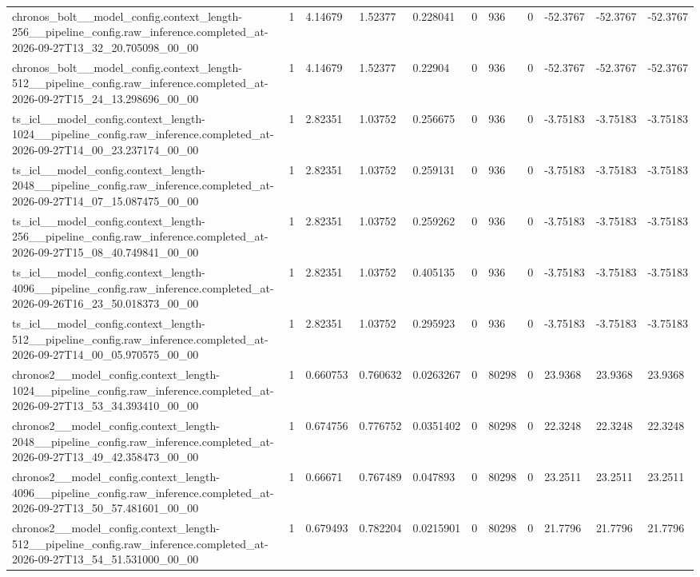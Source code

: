 \begin{tabular}{lllllllllll}
chronos\_bolt\_\_model\_config.context\_length-256\_\_pipeline\_config.raw\_inference.completed\_at-2026-09-27T13\_32\_20.705098\_00\_00 & 1 & 4.14679 & 1.52377 & 0.228041 & 0 & 936 & 0 & -52.3767 & -52.3767 & -52.3767 \\
chronos\_bolt\_\_model\_config.context\_length-512\_\_pipeline\_config.raw\_inference.completed\_at-2026-09-27T15\_24\_13.298696\_00\_00 & 1 & 4.14679 & 1.52377 & 0.22904 & 0 & 936 & 0 & -52.3767 & -52.3767 & -52.3767 \\
ts\_icl\_\_model\_config.context\_length-1024\_\_pipeline\_config.raw\_inference.completed\_at-2026-09-27T14\_00\_23.237174\_00\_00 & 1 & 2.82351 & 1.03752 & 0.256675 & 0 & 936 & 0 & -3.75183 & -3.75183 & -3.75183 \\
ts\_icl\_\_model\_config.context\_length-2048\_\_pipeline\_config.raw\_inference.completed\_at-2026-09-27T14\_07\_15.087475\_00\_00 & 1 & 2.82351 & 1.03752 & 0.259131 & 0 & 936 & 0 & -3.75183 & -3.75183 & -3.75183 \\
ts\_icl\_\_model\_config.context\_length-256\_\_pipeline\_config.raw\_inference.completed\_at-2026-09-27T15\_08\_40.749841\_00\_00 & 1 & 2.82351 & 1.03752 & 0.259262 & 0 & 936 & 0 & -3.75183 & -3.75183 & -3.75183 \\
ts\_icl\_\_model\_config.context\_length-4096\_\_pipeline\_config.raw\_inference.completed\_at-2026-09-26T16\_23\_50.018373\_00\_00 & 1 & 2.82351 & 1.03752 & 0.405135 & 0 & 936 & 0 & -3.75183 & -3.75183 & -3.75183 \\
ts\_icl\_\_model\_config.context\_length-512\_\_pipeline\_config.raw\_inference.completed\_at-2026-09-27T14\_00\_05.970575\_00\_00 & 1 & 2.82351 & 1.03752 & 0.295923 & 0 & 936 & 0 & -3.75183 & -3.75183 & -3.75183 \\
chronos2\_\_model\_config.context\_length-1024\_\_pipeline\_config.raw\_inference.completed\_at-2026-09-27T13\_53\_34.393410\_00\_00 & 1 & 0.660753 & 0.760632 & 0.0263267 & 0 & 80298 & 0 & 23.9368 & 23.9368 & 23.9368 \\
chronos2\_\_model\_config.context\_length-2048\_\_pipeline\_config.raw\_inference.completed\_at-2026-09-27T13\_49\_42.358473\_00\_00 & 1 & 0.674756 & 0.776752 & 0.0351402 & 0 & 80298 & 0 & 22.3248 & 22.3248 & 22.3248 \\
chronos2\_\_model\_config.context\_length-4096\_\_pipeline\_config.raw\_inference.completed\_at-2026-09-27T13\_50\_57.481601\_00\_00 & 1 & 0.66671 & 0.767489 & 0.047893 & 0 & 80298 & 0 & 23.2511 & 23.2511 & 23.2511 \\
chronos2\_\_model\_config.context\_length-512\_\_pipeline\_config.raw\_inference.completed\_at-2026-09-27T13\_54\_51.531000\_00\_00 & 1 & 0.679493 & 0.782204 & 0.0215901 & 0 & 80298 & 0 & 21.7796 & 21.7796 & 21.7796 \\

\end{tabular}
